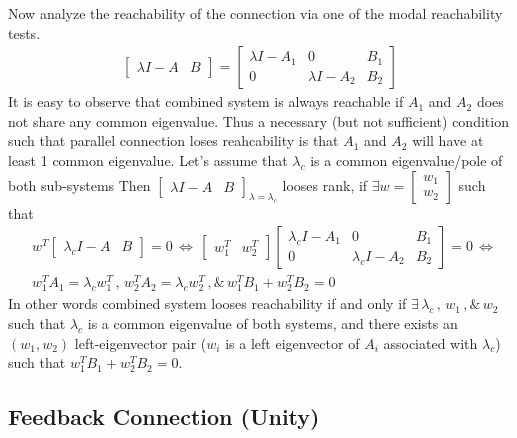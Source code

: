 \documentclass[twoside]{article}
\begin{document}
Now analyze the reachability of the connection via one of the modal reachability tests. 
%
\begin{align*}
	\left[ \begin{array}{c|c} \lambda I - A & B \end{array} \right]
	= 
	\left[ \begin{array}{c|c|c} \lambda I - A_1 & 0 & B_1 \\ \hline 0 &  \lambda I - A_2 & B_2 
	\end{array} \right]
\end{align*}
%
It is easy to observe that combined system is always reachable if $A_1$ 
and $A_2$ does not share any common eigenvalue. Thus a necessary (but not sufficient) condition 
such that parallel connection loses reahcability is that $A_1$ and $A_2$ will have at least 1 
common eigenvalue. Let's assume that $\lambda_c$ is a common eigenvalue/pole of both sub-systems
Then $\left[ \begin{array}{c|c} \lambda I - A & B \end{array} \right]_{\lambda = \lambda_c}$ 
looses rank, if $\exists w = \begin{bmatrix} w_1 \\ w_2 \end{bmatrix}$ such that 
%
%
\begin{align*}
	&w^T \left[ \begin{array}{c|c} \lambda_c I - A & B \end{array} \right] = 0 
	\, \iff \,  \begin{bmatrix} w_1^T & w_2^T \end{bmatrix} \left[ \begin{array}{c|c|c} \lambda_c I - A_1 & 0 & B_1  \\ \hline 0 &  \lambda_c I - A_2 & B_2 \end{array} \right]  = 0
	\, \iff \, 
	\\
	&w_1^T A_1 = \lambda_c w_1^T \, , \, w_2^T A_2 = \lambda_c w_2^T \, , \& \, w_1^T B_1 + w_2^T B_2 = 0
\end{align*}
%
In other words combined system looses reachability if and only if $\exists \, \lambda_c  \, , \, w_1 \, ,\& \, w_2$ such that 
$\lambda_c$ is a common eigenvalue of both systems, and there exists an $(w_1,w_2)$ left-eigenvector pair ($w_i$ is a left eigenvector of $A_i$ associated with $\lambda_c$)
such that $w_1^T B_1 + w_2^T B_2 = 0$.

\subsection{Feedback Connection (Unity)}
		
\end{document}
